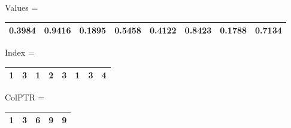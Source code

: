Values = 
\begin{tabular}{|l|l|l|l|l|l|l|l|}
\hline
0.3984&0.9416&0.1895&0.5458&0.4122&0.8423&0.1788&0.7134\\\hline
\end{tabular}

Index = 
\begin{tabular}{|l|l|l|l|l|l|l|l|}
\hline
1&3&1&2&3&1&3&4\\\hline
\end{tabular}

ColPTR = 
\begin{tabular}{|l|l|l|l|l|}
\hline
1&3&6&9&9\\\hline
\end{tabular}

